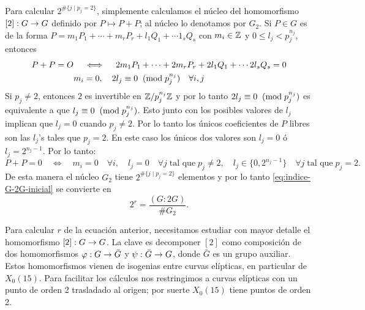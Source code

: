 \documentclass[../../tesis_maestria]{subfiles}
\begin{document}
Para calcular $2^{\#\{j\mid p_j=2\}}$, simplemente calculamos el núcleo del homomorfismo $[2]:G\rightarrow G$ definido por $P\mapsto P+P$; al núcleo lo denotamos por $G_2$. Si $P\in G$ es de la forma $P=m_1 P_1+\cdots+m_r P_r+l_1Q_1+\cdots 1_s Q_s$ con $m_i\in\mathbb{Z}$ y $0\leq l_j<p_j^{n_j}$, entonces
\begin{align*}
	P+P=O&\quad\iff\quad 2m_1 P_1+\cdots+2m_r P_r+2l_1Q_1+\cdots 2l_s Q_s=0\\
&m_i=0,\quad 2l_j\equiv0\;\;(\mathrm{mod}\; p_j^{n_j})\quad\forall i,j	
\end{align*}
Si $p_j\neq2$, entonces $2$ es invertible en $\mathbb{Z}/p_j^{n_j}\mathbb{Z}$ y por lo tanto $2l_j\equiv0\;\;(\mathrm{mod}\; p_j^{n_j})$ es equivalente a que $l_j\equiv0\;\;(\mathrm{mod}\; p_j^{n_j})$. Esto junto con los posibles valores de $l_j$ implican que $l_j=0$ cuando $p_j\neq2$. Por lo tanto los únicos coeficientes de $P$ libres son las $l_j$'s tales que $p_j=2$. En este caso los únicos dos valores son $l_j=0$ ó $l_j=2^{n_j-1}$. Por lo tanto:
\[
	P+P=0\quad\iff\quad m_i=0\quad\forall i,\quad l_j=0\quad\forall j\;\text{tal que}\; p_j\neq2, \quad l_j\in\{0,2^{n_j-1}\}\quad\forall j\;\text{tal que}\; p_j=2.
\]
De esta manera el núcleo $G_2$ tiene $2^{\#\{j\mid p_j=2\}}$ elementos y por lo tanto \eqref{eq:indice-G-2G-inicial} se convierte en
\begin{equation}\label{eq:indice-G-2G}
	2^r =\frac{(G:2G)}{\# G_2}.
\end{equation}

Para calcular $r$ de la ecuación anterior, necesitamos estudiar con mayor detalle el homomorfismo $[2]:G\rightarrow G$. La clave es decomponer $[2]$ como composición de dos homomorfismos $\varphi:G\rightarrow \bar{G}$ y $\psi:\bar{G}\rightarrow G$, donde $\bar{G}$ es un grupo auxiliar. Estos homomorfismos vienen de isogenias entre curvas elípticas, en particular de $X_0(15)$. Para facilitar los cálculos nos restringimos a curvas elípticas con un punto de orden 2 trasladado al origen; por suerte $X_0(15)$ tiene puntos de orden 2.
\end{document}
